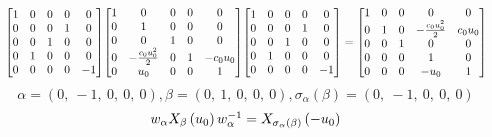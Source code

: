\documentclass[11pt]{article}
\theoremstyle{definition}
\begin{document}
\[
\scaletoalign{\textwidth}{{\left[\begin{matrix}1 & 0 & 0 & 0 & 0\\0 & 0 & 0 & 1 & 0\\0 & 0 & 1 & 0 & 0\\0 & 1 & 0 & 0 & 0\\0 & 0 & 0 & 0 & -1\end{matrix}\right]} {\left[\begin{matrix}1 & 0 & 0 & 0 & 0\\0 & 1 & 0 & 0 & 0\\0 & 0 & 1 & 0 & 0\\0 & - \frac{c_{0} u_{0}^{2}}{2} & 0 & 1 & - c_{0} u_{0}\\0 & u_{0} & 0 & 0 & 1\end{matrix}\right]} {\left[\begin{matrix}1 & 0 & 0 & 0 & 0\\0 & 0 & 0 & 1 & 0\\0 & 0 & 1 & 0 & 0\\0 & 1 & 0 & 0 & 0\\0 & 0 & 0 & 0 & -1\end{matrix}\right]} = {\left[\begin{matrix}1 & 0 & 0 & 0 & 0\\0 & 1 & 0 & - \frac{c_{0} u_{0}^{2}}{2} & c_{0} u_{0}\\0 & 0 & 1 & 0 & 0\\0 & 0 & 0 & 1 & 0\\0 & 0 & 0 & - u_{0} & 1\end{matrix}\right]}}
\]
\[
\alpha = \left( 0, \  -1, \  0, \  0, \  0\right), \beta = \left( 0, \  1, \  0, \  0, \  0\right), \sigma_{\alpha}(\beta) = \left( 0, \  -1, \  0, \  0, \  0\right)
\]
\[
\scaletoalign{\textwidth}{w_{\alpha} X_{\beta}\left(u_{0}\right) w_{\alpha}^{-1} = X_{\sigma_{\alpha}\left(\beta\right)}\left(- u_{0}\right)}
\]
\end{document}

